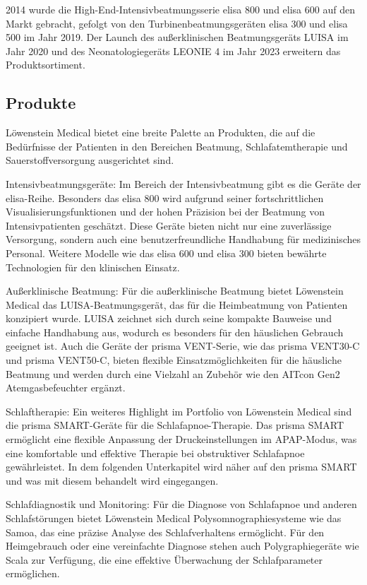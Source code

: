 \documentclass[a4paper, 12pt]{article}
\begin{document}
2014 wurde die High-End-Intensivbeatmungsserie elisa 800 und elisa 600 auf den Markt gebracht, gefolgt von den Turbinenbeatmungsgeräten elisa 300 und elisa 500 im Jahr 2019. Der Launch des außerklinischen Beatmungsgeräts LUISA im Jahr 2020 und des Neonatologiegeräts LEONIE 4 im Jahr 2023 erweitern das Produktsortiment. \cite{loewenstein}


\subsection{Produkte}\label{products} %

Löwenstein Medical bietet eine breite Palette an Produkten, die auf die Bedürfnisse der Patienten  in den Bereichen Beatmung, Schlafatemtherapie und Sauerstoffversorgung ausgerichtet sind.

Intensivbeatmungsgeräte:
Im Bereich der Intensivbeatmung gibt es die Geräte der elisa-Reihe. Besonders das elisa 800 wird aufgrund seiner fortschrittlichen Visualisierungsfunktionen und der hohen Präzision bei der Beatmung von Intensivpatienten geschätzt. Diese Geräte bieten nicht nur eine zuverlässige Versorgung, sondern auch eine benutzerfreundliche Handhabung für medizinisches Personal. Weitere Modelle wie das elisa 600 und elisa 300 bieten bewährte Technologien für den klinischen Einsatz.

Außerklinische Beatmung:
Für die außerklinische Beatmung bietet Löwenstein Medical das LUISA-Beatmungsgerät, das für die Heimbeatmung von Patienten konzipiert wurde. LUISA zeichnet sich durch seine kompakte Bauweise und einfache Handhabung aus, wodurch es besonders für den häuslichen Gebrauch geeignet ist. Auch die Geräte der prisma VENT-Serie, wie das prisma VENT30-C und prisma VENT50-C, bieten flexible Einsatzmöglichkeiten für die häusliche Beatmung und werden durch eine Vielzahl an Zubehör wie den AITcon Gen2 Atemgasbefeuchter ergänzt.

Schlaftherapie:
Ein weiteres Highlight im Portfolio von Löwenstein Medical sind die prisma SMART-Geräte für die Schlafapnoe-Therapie. Das prisma SMART ermöglicht eine flexible Anpassung der Druckeinstellungen im APAP-Modus, was eine komfortable und effektive Therapie bei obstruktiver Schlafapnoe gewährleistet. In dem folgenden Unterkapitel wird näher auf den prisma SMART und was mit diesem behandelt wird eingegangen.

Schlafdiagnostik und Monitoring:
Für die Diagnose von Schlafapnoe und anderen Schlafstörungen bietet Löwenstein Medical Polysomnographiesysteme wie das Samoa, das eine präzise Analyse des Schlafverhaltens ermöglicht. Für den Heimgebrauch oder eine vereinfachte Diagnose stehen auch Polygraphiegeräte wie Scala zur Verfügung, die eine effektive Überwachung der Schlafparameter ermöglichen.
\end{document}
